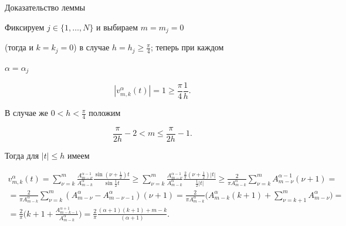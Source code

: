 \begin{pf*}{Доказательство леммы}


Фиксируем $j\in \{1,\dotsc,N\}$ и выбираем $m=m_j=0$


(тогда и $k=k_j=0$) в случае $h=h_j\ge\frac{\pi}{4}$; теперь при каждом 


$\alpha=\alpha_j$


\begin{equation}


|v_{m,k}^\alpha (t)|=1\ge \frac{\pi}{4} \frac{1}{h}.


\end{equation}


В случае же $0<h<\frac{\pi}{4}$ положим


\begin{equation}


\frac{\pi}{2h} -2<m\le\frac{\pi}{2h}-1.


\end{equation}


Тогда для $|t|\le h $ имеем


\begin{multline}


v_{m,k}^{\alpha} (t)=\sum_{\nu=k}^{m} \frac


{A_{m-\nu}^{\alpha-1}}{A_{m-k}^{\alpha}}\frac


{\sin(\nu+\frac {1}{2})t}{\sin\frac{1}{2}t}\ge 


\sum_{\nu=k}^{m} \frac


{A_{m-\nu}^{\alpha-1}}{A_{m-k}^{\alpha}}\frac


{\frac{2}{\pi}(\nu+\frac {1}{2})|t|}{\frac{1}{2}|t|}\ge


\frac{2}{\pi A_{m-k}^{\alpha}}\sum_{\nu=k}^{m}


A_{m-\nu}^{\alpha-1}(\nu+1)= \\


%


=\frac{2}{\pi A_{m-k}^{\alpha}}\sum_{\nu=k}^{m}


(A_{m-\nu}^{\alpha}-A_{m-\nu-1}^{\alpha})(\nu+1)=


\frac{2}{\pi A_{m-k}^{\alpha}}\bigg(A_{m-k}^\alpha (k+1)+


\sum_{\nu=k+1}^{m} A_{m-\nu}^{\alpha}\bigg)= \\


%


=\frac{2}{\pi } \bigg(k+1+


\frac{ A_{m-k-1}^{\alpha+1}}{A_{m-k}^{\alpha}}\bigg)=


\frac{2}{\pi } \frac{(\alpha+1)(k+1)+m-k}{(\alpha+1)}.



\end{multline}
\end{pf*}
